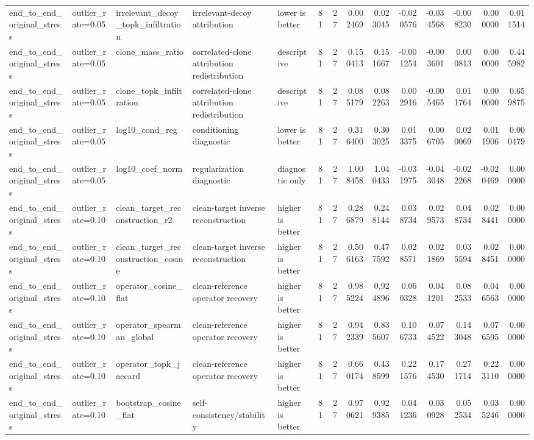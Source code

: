 \begin{table}[t]
\begin{tabular}{lllllrrrrrrrrr}
end_to_end_original_stress & outlier_rate=0.05 & irrelevant_decoy_topk_infiltration & irrelevant-decoy attribution & lower is better & 81 & 27 & 0.002469 & 0.023045 & -0.020576 & -0.034568 & -0.008230 & 0.000000 & 0.011514 \\
end_to_end_original_stress & outlier_rate=0.05 & clone_mass_ratio & correlated-clone attribution redistribution & descriptive & 81 & 27 & 0.150413 & 0.151667 & -0.001254 & -0.003601 & 0.000813 & 0.000000 & 0.445982 \\
end_to_end_original_stress & outlier_rate=0.05 & clone_topk_infiltration & correlated-clone attribution redistribution & descriptive & 81 & 27 & 0.085179 & 0.082263 & 0.002916 & -0.005465 & 0.011764 & 0.000000 & 0.659875 \\
end_to_end_original_stress & outlier_rate=0.05 & log10_cond_reg & conditioning diagnostic & lower is better & 81 & 27 & 0.316400 & 0.303025 & 0.013375 & 0.006705 & 0.020069 & 0.011906 & 0.000479 \\
end_to_end_original_stress & outlier_rate=0.05 & log10_coef_norm & regularization diagnostic & diagnostic only & 81 & 27 & 1.008458 & 1.040433 & -0.031975 & -0.043048 & -0.022268 & -0.020469 & 0.000000 \\
end_to_end_original_stress & outlier_rate=0.10 & clean_target_reconstruction_r2 & clean-target inverse reconstruction & higher is better & 81 & 27 & 0.286879 & 0.248144 & 0.038734 & 0.029573 & 0.048734 & 0.028441 & 0.000000 \\
end_to_end_original_stress & outlier_rate=0.10 & clean_target_reconstruction_cosine & clean-target inverse reconstruction & higher is better & 81 & 27 & 0.506163 & 0.477592 & 0.028571 & 0.021869 & 0.035594 & 0.028451 & 0.000000 \\
end_to_end_original_stress & outlier_rate=0.10 & operator_cosine_flat & clean-reference operator recovery & higher is better & 81 & 27 & 0.985224 & 0.924896 & 0.060328 & 0.041201 & 0.082533 & 0.046563 & 0.000000 \\
end_to_end_original_stress & outlier_rate=0.10 & operator_spearman_global & clean-reference operator recovery & higher is better & 81 & 27 & 0.942339 & 0.835607 & 0.106733 & 0.074522 & 0.143048 & 0.076595 & 0.000000 \\
end_to_end_original_stress & outlier_rate=0.10 & operator_topk_jaccard & clean-reference operator recovery & higher is better & 81 & 27 & 0.660174 & 0.438599 & 0.221576 & 0.174530 & 0.271714 & 0.223110 & 0.000000 \\
end_to_end_original_stress & outlier_rate=0.10 & bootstrap_cosine_flat & self-consistency/stability & higher is better & 81 & 27 & 0.970621 & 0.929385 & 0.041236 & 0.030928 & 0.052534 & 0.035246 & 0.000000 \\

\end{tabular}
\end{table}
